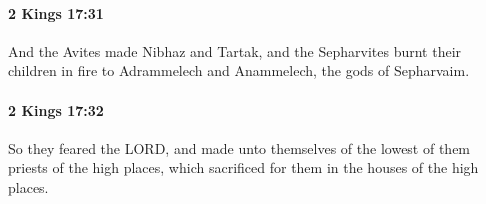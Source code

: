 		\paragraph{2 Kings 17:31} %
			\label{2KINGS-17-31}

			And the Avites made Nibhaz and Tartak, and the Sepharvites burnt their children in fire to Adrammelech and Anammelech, the gods of Sepharvaim.


		\paragraph{2 Kings 17:32} %
			\label{2KINGS-17-32}

			So they feared the LORD, and made unto themselves of the lowest of them priests of the high places, which sacrificed for them in the houses of the high places.



